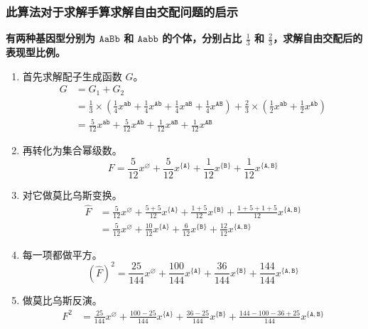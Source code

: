 \documentclass[12pt]{article} %
\begin{document}
\subsubsection*{此算法对于求解手算求解自由交配问题的启示}

\textbf{有两种基因型分别为 $\texttt{AaBb}$ 和 $\texttt{Aabb}$ 的个体，分别占比 $\frac{1}{3}$ 和 $\frac{2}{3}$，求解自由交配后的表现型比例。}

\begin{enumerate}
	\item 首先求解配子生成函数 $G$。\\ 
		$$
		\begin{aligned}
			G &= G_1+G_2 \\
			  &= \frac{1}{3} \times (\frac{1}{4}x^{\texttt{ab}}+\frac{1}{4}x^{\texttt{Ab}}+\frac{1}{4}x^{\texttt{aB}}+\frac{1}{4}x^{\texttt{AB}})+\frac{2}{3} \times (\frac{1}{2}x^{\texttt{ab}} + \frac{1}{2}x^{\texttt{Ab}}) \\
			  &= \frac{5}{12} x^{\texttt{ab}} + \frac{5}{12} x^{\texttt{Ab}} + \frac{1}{12} x^{\texttt{aB}} + \frac{1}{12} x^{\texttt{AB}}
		\end{aligned}
		$$
	\item 再转化为集合幂级数。\\
		$$F = \frac{5}{12} x^{\varnothing} + \frac{5}{12} x^{\{\texttt{A}\}} + \frac{1}{12} x^{\{\texttt{B}\}} + \frac{1}{12} x^{\{\texttt{A},\texttt{B}\}}$$
	\item 对它做莫比乌斯变换。\\
		$$
		\begin{aligned}
			\hat F &= \frac{5}{12} x^{\varnothing} + \frac{5+5}{12} x^{\{\texttt{A}\}} + \frac{1+5}{12} x^{\{\texttt{B}\}} + \frac{1+5+1+5}{12} x^{\{\texttt{A},\texttt{B}\}} \\
			  &= \frac{5}{12} x^{\varnothing} + \frac{10}{12} x^{\{\texttt{A}\}} + \frac{6}{12} x^{\{\texttt{B}\}} + \frac{12}{12} x^{\{\texttt{A},\texttt{B}\}}
		\end{aligned}
		$$
	\item 每一项都做平方。\\
		$$(\hat F)^2=\frac{25}{144} x^{\varnothing} + \frac{100}{144} x^{\{\texttt{A}\}} + \frac{36}{144} x^{\{\texttt{B}\}} + \frac{144}{144} x^{\{\texttt{A},\texttt{B}\}}$$
	\item 做莫比乌斯反演。\\
		$$
		\begin{aligned}
			F^2 &= \frac{25}{144} x^{\varnothing} + \frac{100-25}{144} x^{\{\texttt{A}\}} + \frac{36-25}{144} x^{\{\texttt{B}\}} + \frac{144-100-36+25}{144} x^{\{\texttt{A},\texttt{B}\}} \\

\end{aligned}$$
\end{enumerate}
\end{document}

